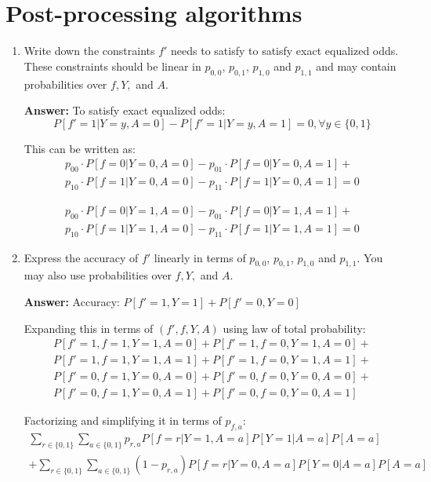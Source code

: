 \section{Post-processing algorithms}
\begin{enumerate}
	\item Write down the constraints $f'$ needs to satisfy to satisfy exact equalized odds. These constraints should be linear in $p_{0,0}$, $p_{0,1}$, $p_{1,0}$ and $p_{1,1}$ and may contain probabilities over $f, Y,$ and $A$.
	
	\textbf{Answer:} To satisfy exact equalized odds:
    $$ P[f'=1|Y=y, A=0] - P[f'=1|Y=y, A=1] = 0, \forall y \in \{0, 1\} $$

    This can be written as:
    \[
    \begin{aligned}
         p_{00} \cdot P[f = 0|Y = 0, A = 0] - p_{01} \cdot P[f = 0|Y = 0, A = 1] +\\
        p_{10} \cdot P[f = 1|Y = 0, A = 0] - p_{11} \cdot P[f = 1|Y = 0, A = 1] = 0
    \end{aligned}
    \]

    \[
    \begin{aligned}
         p_{00} \cdot P[f = 0|Y = 1, A = 0] - p_{01} \cdot P[f = 0|Y = 1, A = 1] +\\
    p_{10} \cdot P[f = 1|Y = 1, A = 0] - p_{11} \cdot P[f = 1|Y = 1, A = 1] = 0
    \end{aligned}
    \]

 
	\item Express the accuracy of $f'$ linearly in terms of $p_{0,0}$, $p_{0,1}$, $p_{1,0}$ and $p_{1,1}$. You may also use probabilities over $f, Y,$ and $A$.
	
	\textbf{Answer:} Accuracy: $P[f' = 1, Y = 1] + P[f' = 0, Y = 0]$

    Expanding this in terms of $(f', f, Y, A)$ using law of total probability:
    \[
    \begin{aligned}
         P[f' = 1, f = 1, Y = 1, A = 0] + P[f' = 1, f = 0, Y = 1, A = 0]+\\
         P[f' = 1, f = 1, Y = 1, A = 1] + P[f' = 1, f = 0, Y = 1, A = 1]+\\
         P[f' = 0, f = 1, Y = 0, A = 0] + P[f' = 0, f = 0, Y = 0, A = 0]+\\
         P[f' = 0, f = 1, Y = 0, A = 1] + P[f' = 0, f = 0, Y = 0, A = 1]
    \end{aligned}
    \]

    Factorizing and simplifying it in terms of $p_{f,a}$:
    \[
    \begin{aligned}
         \sum_{r \in \{0, 1\}} \sum_{a \in \{0, 1\}} p_{r, a} P[f = r|Y = 1, A = a] P[Y = 1|A = a] P[A = a] \\
         + \sum_{r \in \{0, 1\}} \sum_{a \in \{0, 1\}} (1-p_{r, a}) P[f = r|Y = 0, A = a] P[Y = 0|A = a] P[A = a]
    \end{aligned}
    \]
    
\end{enumerate}

